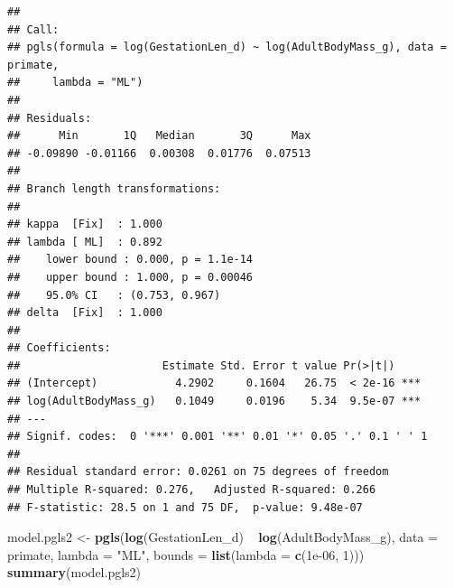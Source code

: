 \documentclass[]{article}
\newenvironment{Shaded}{\begin{snugshade}}{\end{snugshade}}
\newcommand{\KeywordTok}[1]{\textcolor[rgb]{0.13,0.29,0.53}{\textbf{{#1}}}}
\newcommand{\DataTypeTok}[1]{\textcolor[rgb]{0.13,0.29,0.53}{{#1}}}
\newcommand{\DecValTok}[1]{\textcolor[rgb]{0.00,0.00,0.81}{{#1}}}
\newcommand{\FloatTok}[1]{\textcolor[rgb]{0.00,0.00,0.81}{{#1}}}
\newcommand{\StringTok}[1]{\textcolor[rgb]{0.31,0.60,0.02}{{#1}}}
\newcommand{\NormalTok}[1]{{#1}}
\begin{document}
\begin{verbatim}
## 
## Call:
## pgls(formula = log(GestationLen_d) ~ log(AdultBodyMass_g), data = primate, 
##     lambda = "ML")
## 
## Residuals:
##      Min       1Q   Median       3Q      Max 
## -0.09890 -0.01166  0.00308  0.01776  0.07513 
## 
## Branch length transformations:
## 
## kappa  [Fix]  : 1.000
## lambda [ ML]  : 0.892
##    lower bound : 0.000, p = 1.1e-14
##    upper bound : 1.000, p = 0.00046
##    95.0% CI   : (0.753, 0.967)
## delta  [Fix]  : 1.000
## 
## Coefficients:
##                      Estimate Std. Error t value Pr(>|t|)    
## (Intercept)            4.2902     0.1604   26.75  < 2e-16 ***
## log(AdultBodyMass_g)   0.1049     0.0196    5.34  9.5e-07 ***
## ---
## Signif. codes:  0 '***' 0.001 '**' 0.01 '*' 0.05 '.' 0.1 ' ' 1
## 
## Residual standard error: 0.0261 on 75 degrees of freedom
## Multiple R-squared: 0.276,   Adjusted R-squared: 0.266 
## F-statistic: 28.5 on 1 and 75 DF,  p-value: 9.48e-07
\end{verbatim}

\begin{Shaded}
\end{Shaded}

\begin{Shaded}
\begin{Highlighting}[]
\NormalTok{model.pgls2 <-}\StringTok{ }\KeywordTok{pgls}\NormalTok{(}\KeywordTok{log}\NormalTok{(GestationLen_d) ~}\StringTok{ }\KeywordTok{log}\NormalTok{(AdultBodyMass_g), }\DataTypeTok{data =} \NormalTok{primate, }
    \DataTypeTok{lambda =} \StringTok{"ML"}\NormalTok{, }\DataTypeTok{bounds =} \KeywordTok{list}\NormalTok{(}\DataTypeTok{lambda =} \KeywordTok{c}\NormalTok{(}\FloatTok{1e-06}\NormalTok{, }\DecValTok{1}\NormalTok{)))}
\KeywordTok{summary}\NormalTok{(model.pgls2)}
\end{Highlighting}
\end{Shaded}
\end{document}
